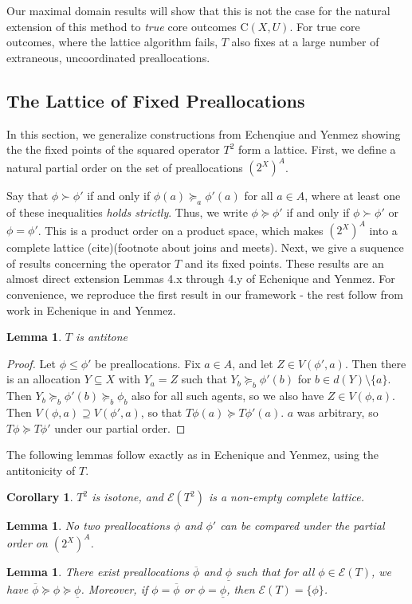 \documentclass[11pt,reqno]{amsart}
\newtheorem{lemma}[thm]{Lemma}
\newtheorem{cor}[thm]{Corollary}
\theoremstyle{definition}
\numberwithin{equation}{section}
\newcommand{\prf}{\begin{proof}}
\newcommand{\eprf}{\end{proof}}
\newcommand{\ol}{\overline}
\newcommand{\ul}{\underline}
\newcommand{\pre}{\phi}
\newcommand{\prealloc}{(2^X)^A}
\newcommand{\sub}{\subseteq}
\newcommand{\core}{\mathrm{C}(X,U)}
\newcommand{\fix}{\mathcal{E}}
\newcommand{\suq}{\succeq}
\newcommand{\su}{\succ}
\begin{document}
Our maximal domain results will show that this is not the case for the natural extension of this method to \emph{true} core outcomes $\core$.
For true core outcomes, where the lattice algorithm fails, $T$ also fixes at a large number of extraneous, uncoordinated preallocations. 
\subsection{The Lattice of Fixed Preallocations}
In this section, we generalize constructions from Echenqiue and Yenmez showing the the fixed points of the squared operator $T^2$ form a lattice. 
First, we define a natural partial order on the set of preallocations $\prealloc$.

Say that $\pre \su \pre'$ if and only if $\pre(a) \suq_a \pre'(a)$ for all $a \in A$, where at least one of these inequalities \emph{holds strictly}. 
Thus, we write $\pre \suq \pre'$ if and only if $\pre \su \pre'$ or $\pre = \pre'$. 
This is a product order on a product space, which makes $\prealloc$ into a complete lattice (cite)(footnote about joins and meets). 
Next, we give a suquence of results concerning the operator $T$ and its fixed points. 
These results are an almost direct extension Lemmas 4.x through 4.y of Echenique and Yenmez.
For convenience, we reproduce the first result in our framework - the rest follow from work in Echenique in and Yenmez. 
\begin{lemma} $T$ is antitone 
\end{lemma}
\prf
Let $\pre \leq \pre'$ be preallocations.
Fix $a \in A$, and let $Z \in V(\pre',a)$.
Then there is an allocation $Y \sub X$ with $Y_a = Z$ such that $Y_b \suq_b \pre'(b)$ for $b \in d(Y) \setminus \{a\}$.
Then $Y_b \suq_b \pre'(b) \suq_b \pre_b$ also for all such agents, so we also have $Z \in V(\pre,a)$.
Then $V(\pre,a) \supseteq V(\pre',a)$, so that $T\pre(a) \suq T\pre'(a)$. $a$ was arbitrary, so $T\pre \suq T\pre'$ under our partial order. 
\eprf
The following lemmas follow exactly as in Echenique and Yenmez, using the antitonicity of $T$. 
\begin{cor} $T^2$ is isotone, and $\fix(T^2)$ is a non-empty complete lattice. 
\end{cor}
\begin{lemma} No two preallocations $\pre$ and $\pre'$ can be compared under the partial order on $\prealloc$.
\end{lemma}
\begin{lemma} There exist preallocations $\ol{\pre}$ and $\ul{\pre}$ such that for all $\pre \in \fix(T)$, we have $\ol{\pre} \suq \pre \suq \ul{\pre}$. Moreover, if $\pre = \ol{\pre}$ or $\pre = \ul{\pre}$, then $\fix(T) = \{\pre\}$. 
\end{lemma}
\end{document}
